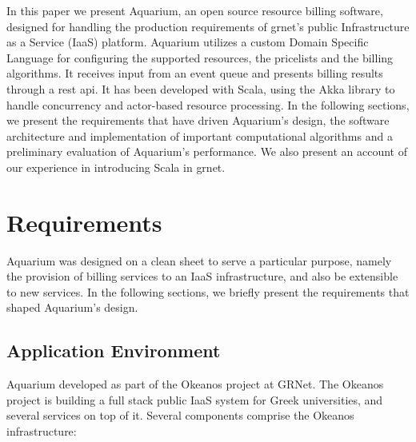 \documentclass[preprint,10pt]{sigplanconf}
\begin{document}
In this paper we present Aquarium, an open source resource billing software,
designed for handling the production  requirements of {\sc grnet}'s public
Infrastructure as a Service (IaaS) platform. Aquarium utilizes a custom Domain
Specific Language for configuring the supported resources, the pricelists and
the billing algorithms. It receives input from an event queue and presents
billing results through a {\sc rest api}. It has been developed with Scala,
using the Akka library to handle concurrency and actor-based resource
processing. In the following sections, we present the requirements that have driven
Aquarium's design, the software architecture and implementation of important
computational algorithms and a preliminary evaluation of Aquarium's
performance. We also present an account of our experience in introducing Scala
in {\sc grnet}.

\section{Requirements}

Aquarium was designed on a clean sheet to serve a particular purpose,
namely the provision of billing services to an IaaS infrastructure,
and also be extensible to new services. In the following sections,
we briefly present the requirements that shaped Aquarium's design.

\subsection{Application Environment}
Aquarium developed as part of the Okeanos project at GRNet. The
Okeanos project is building a full stack public IaaS system for Greek
universities, and several services on top of it. Several components comprise
the Okeanos infrastructure:
\end{document}
